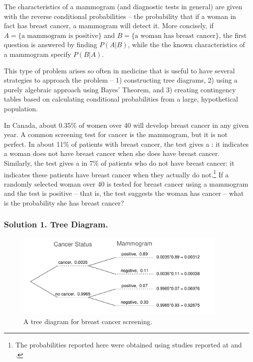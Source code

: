 The characteristics of a mammogram (and diagnostic tests in general) are given with the reverse conditional probabilities --  the probability that if a woman in fact has breast cancer, a mammogram will detect it.  More concisely, if $A = \text{\{a mammogram is  positive\}}$ and $B = \text{\{a woman has breast cancer\}}$, the first question is answered by finding $P(A|B)$, while the the known characteristics of a mammogram specify $P(B|A)$.

This type of problem arises so often in medicine that is useful to have several strategies to approach the problem -- 1) constructing tree diagrams, 2) using a purely algebraic approach using Bayes' Theorem, and 3) creating contingency tables based on calculating conditional probabilities from a large, hypothetical population.

\begin{example}{In Canada, about 0.35\% of women over 40 will develop breast cancer in any given year. A common screening test for cancer is the mammogram, but it is not perfect. In about 11\% of patients with breast cancer, the test gives a : it indicates a woman does not have breast cancer when she does have breast cancer. Similarly, the test gives a  in 7\% of patients who do not have breast cancer: it indicates these patients have breast cancer when they actually do not.\footnote{The probabilities reported here were obtained using studies reported at  and .} If a randomly selected woman over 40 is tested for breast cancer using a mammogram and the test is positive -- that is, the test suggests the woman has cancer -- what is the probability she has breast cancer?}
\label{probabilityOfBreastCancerGivenPositiveTestExample}
\end{example}

\subsubsection{Solution 1. Tree Diagram.}

\begin{figure}[h]
	\centering
	\includegraphics[width=0.93\textwidth]{ch_probability_oi_biostat/figures/BreastCancerTreeDiagram/BreastCancerTreeDiagram}
	\caption{A tree diagram for breast cancer screening.}
	\label{BreastCancerTreeDiagram}
\end{figure}


